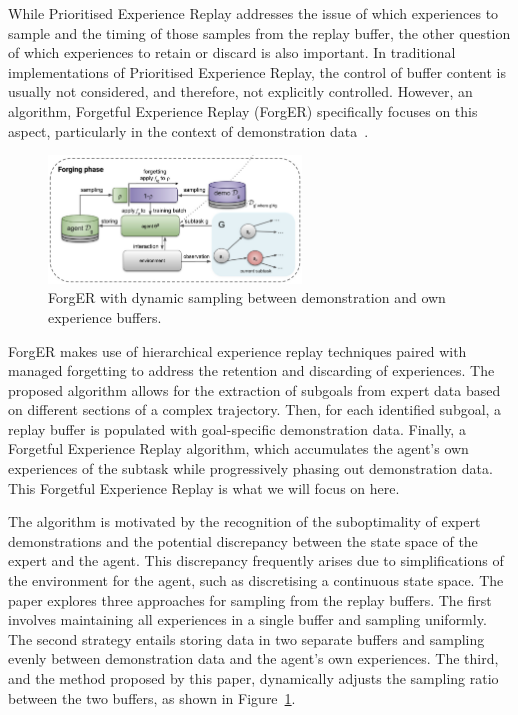 While Prioritised Experience Replay addresses the issue of which experiences to sample and the timing of those samples from the replay buffer, the other question of which experiences to retain or discard is also important. 
In traditional implementations of Prioritised Experience Replay, the control of buffer content is usually not considered, and therefore, not explicitly controlled. 
However, an algorithm, Forgetful Experience Replay (ForgER) specifically focuses on this aspect, particularly in the context of demonstration data~\cite{fyp16-forgetful-experience-replay}.

\begin{figure}[htbp]
  \centering
  \includegraphics[width=0.6\textwidth]{background/fyp16-forger-arch.png}
  \caption{ForgER with dynamic sampling between demonstration and own experience buffers.}
\label{fig:fyp16-forger-arch}
\end{figure}

ForgER makes use of hierarchical experience replay techniques paired with managed forgetting to address the retention and discarding of experiences. 
The proposed algorithm allows for the extraction of subgoals from expert data based on different sections of a complex trajectory. 
Then, for each identified subgoal, a replay buffer is populated with goal-specific demonstration data. 
Finally, a Forgetful Experience Replay algorithm, which accumulates the agent's own experiences of the subtask while progressively phasing out demonstration data.
This Forgetful Experience Replay is what we will focus on here.

The algorithm is motivated by the recognition of the suboptimality of expert demonstrations and the potential discrepancy between the state space of the expert and the agent.
This discrepancy frequently arises due to simplifications of the environment for the agent, such as discretising a continuous state space.
The paper explores three approaches for sampling from the replay buffers.
The first involves maintaining all experiences in a single buffer and sampling uniformly.
The second strategy entails storing data in two separate buffers and sampling evenly between demonstration data and the agent's own experiences.
The third, and the method proposed by this paper, dynamically adjusts the sampling ratio between the two buffers, as shown in Figure~\ref{fig:fyp16-forger-arch}.

